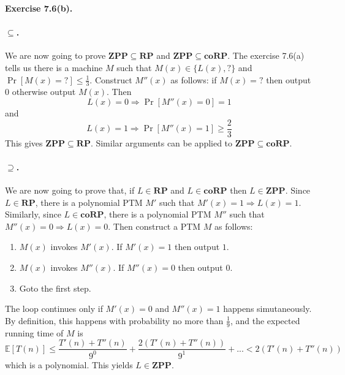 \documentclass[a4paper]{article}
\newenvironment{exercise}[1]{
	\par
	\noindent\textbf{Exercise #1.}\quad
}{
	\par
	\bigskip
}
\begin{document}
    \begin{exercise}{7.6(b)}
		\paragraph{$\subseteq$.} We are now going to prove $\mathbf{ZPP}\subseteq\mathbf{RP}$ and $\mathbf{ZPP}\subseteq\mathbf{coRP}$. The exercise 7.6(a) tells us there is a machine $M$ such that $M(x)\in\{L(x),?\}$ and $\Pr[M(x)=?]\leq\frac{1}{3}$. Construct $M''(x)$ as follows: if $M(x)=?$ then output $0$ otherwise output $M(x)$. Then
		$$L(x)=0\Rightarrow\Pr[M''(x)=0]=1$$
		and
		$$L(x)=1\Rightarrow\Pr[M''(x)=1]\geq\frac{2}{3}$$
		This gives $\mathbf{ZPP}\subseteq\mathbf{RP}$. Similar arguments can be applied to $\mathbf{ZPP}\subseteq\mathbf{coRP}$. 
		
		\paragraph{$\supseteq$.} We are now going to prove that, if $L\in\mathbf{RP}$ and $L\in\mathbf{coRP}$ then $L\in\mathbf{ZPP}$. Since $L\in\mathbf{RP}$, there is a polynomial PTM $M'$ such that $M'(x)=1\Rightarrow L(x)=1$. Similarly, since $L\in\mathbf{coRP}$, there is a polynomial PTM $M''$ such that $M''(x)=0\Rightarrow L(x)=0$. Then construct a PTM $M$ as follows:
		\begin{enumerate}
			\item $M(x)$ invokes $M'(x)$. If $M'(x)=1$ then output $1$.
			\item $M(x)$ invokes $M''(x)$. If $M''(x)=0$ then output $0$. 
			\item Goto the first step.
		\end{enumerate}
	
		The loop continues only if $M'(x)=0$ and $M''(x)=1$ happens simutaneously. By definition, this happens with probability no more than $\frac{1}{9}$, and the expected running time of $M$ is
		$$\mathbb{E}[T(n)]\leq\frac{T'(n)+T''(n)}{9^0}+\frac{2(T'(n)+T''(n))}{9^1}+...< 2(T'(n)+T''(n))$$
		which is a polynomial. This yields $L\in\mathbf{ZPP}$. 
		
    \end{exercise}
\end{document}
